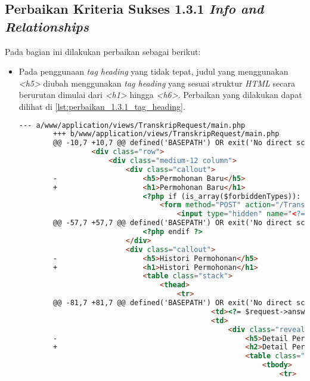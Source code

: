 \subsection{Perbaikan Kriteria Sukses 1.3.1 \textit{Info and Relationships}}
\label{subsec:perbaikan_kriteria_sukses_1.3.1}
Pada bagian ini dilakukan perbaikan sebagai berikut:

\begin{itemize}
    \item Pada penggunaan \textit{tag heading} yang tidak tepat, judul yang menggunakan \textit{<h5>} diubah menggunakan \textit{tag heading} yang sesuai struktur \textit{HTML} secara berurutan dimulai dari \textit{<h1>} hingga \textit{<h6>}. Perbaikan yang dilakukan dapat dilihat di \ref{lst:perbaikan_1.3.1_tag_heading}.
    \begin{lstlisting}[frame=single, label={lst:perbaikan_1.3.1_tag_heading}, language=HTML, caption=Perbaikan Kriteria Sukses 1.3.1 - Penggunaan \textit{Heading} Tidak Tepat]
        --- a/www/application/views/TranskripRequest/main.php
        +++ b/www/application/views/TranskripRequest/main.php
        @@ -10,7 +10,7 @@ defined('BASEPATH') OR exit('No direct script access allowed');
                 <div class="row">
                     <div class="medium-12 column">
                         <div class="callout">
        -                    <h5>Permohonan Baru</h5>
        +                    <h1>Permohonan Baru</h1>
                             <?php if (is_array($forbiddenTypes)): ?>
                                 <form method="POST" action="/TranskripRequest/add">
                                     <input type="hidden" name="<?= $this->security->get_csrf_token_name() ?>" value="<?= $this->security->get_csrf_hash() ?>" />
        @@ -57,7 +57,7 @@ defined('BASEPATH') OR exit('No direct script access allowed');
                             <?php endif ?>
                         </div>
                         <div class="callout">
        -                    <h5>Histori Permohonan</h5>
        +                    <h1>Histori Permohonan</h1>
                             <table class="stack">
                                 <thead>
                                     <tr>
        @@ -81,7 +81,7 @@ defined('BASEPATH') OR exit('No direct script access allowed');
                                             <td><?= $request->answeredMessage ?></td>
                                             <td>
                                                 <div class="reveal" id="detail<?= $request->id ?>" data-reveal>
        -                                            <h5>Detail Permohonan #<?= $request->id ?></h5>
        +                                            <h2>Detail Permohonan #<?= $request->id ?></h2>
                                                     <table class="stack">
                                                         <tbody>
                                                             <tr>
        

\end{lstlisting}
\end{itemize}
